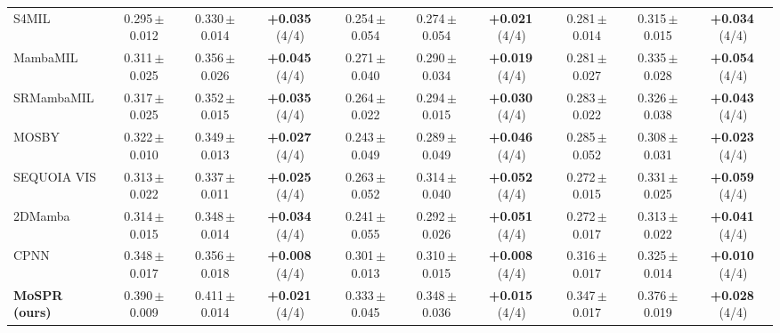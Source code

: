\begin{tabular}{lccccccccc}
S4MIL & 0.295\,{\tiny$\pm$0.012} & 0.330\,{\tiny$\pm$0.014} & \textbf{+0.035}\,{\tiny(4/4)} & 0.254\,{\tiny$\pm$0.054} & 0.274\,{\tiny$\pm$0.054} & \textbf{+0.021}\,{\tiny(4/4)} & 0.281\,{\tiny$\pm$0.014} & 0.315\,{\tiny$\pm$0.015} & \textbf{+0.034}\,{\tiny(4/4)}\\
MambaMIL & 0.311\,{\tiny$\pm$0.025} & 0.356\,{\tiny$\pm$0.026} & \textbf{+0.045}\,{\tiny(4/4)} & 0.271\,{\tiny$\pm$0.040} & 0.290\,{\tiny$\pm$0.034} & \textbf{+0.019}\,{\tiny(4/4)} & 0.281\,{\tiny$\pm$0.027} & 0.335\,{\tiny$\pm$0.028} & \textbf{+0.054}\,{\tiny(4/4)}\\
SRMambaMIL & 0.317\,{\tiny$\pm$0.025} & 0.352\,{\tiny$\pm$0.015} & \textbf{+0.035}\,{\tiny(4/4)} & 0.264\,{\tiny$\pm$0.022} & 0.294\,{\tiny$\pm$0.015} & \textbf{+0.030}\,{\tiny(4/4)} & 0.283\,{\tiny$\pm$0.022} & 0.326\,{\tiny$\pm$0.038} & \textbf{+0.043}\,{\tiny(4/4)}\\
MOSBY & 0.322\,{\tiny$\pm$0.010} & 0.349\,{\tiny$\pm$0.013} & \textbf{+0.027}\,{\tiny(4/4)} & 0.243\,{\tiny$\pm$0.049} & 0.289\,{\tiny$\pm$0.049} & \textbf{+0.046}\,{\tiny(4/4)} & 0.285\,{\tiny$\pm$0.052} & 0.308\,{\tiny$\pm$0.031} & \textbf{+0.023}\,{\tiny(4/4)}\\
SEQUOIA VIS & 0.313\,{\tiny$\pm$0.022} & 0.337\,{\tiny$\pm$0.011} & \textbf{+0.025}\,{\tiny(4/4)} & 0.263\,{\tiny$\pm$0.052} & 0.314\,{\tiny$\pm$0.040} & \textbf{+0.052}\,{\tiny(4/4)} & 0.272\,{\tiny$\pm$0.015} & 0.331\,{\tiny$\pm$0.025} & \textbf{+0.059}\,{\tiny(4/4)}\\
2DMamba & 0.314\,{\tiny$\pm$0.015} & 0.348\,{\tiny$\pm$0.014} & \textbf{+0.034}\,{\tiny(4/4)} & 0.241\,{\tiny$\pm$0.055} & 0.292\,{\tiny$\pm$0.026} & \textbf{+0.051}\,{\tiny(4/4)} & 0.272\,{\tiny$\pm$0.017} & 0.313\,{\tiny$\pm$0.022} & \textbf{+0.041}\,{\tiny(4/4)}\\
CPNN & 0.348\,{\tiny$\pm$0.017} & 0.356\,{\tiny$\pm$0.018} & \textbf{+0.008}\,{\tiny(4/4)} & 0.301\,{\tiny$\pm$0.013} & 0.310\,{\tiny$\pm$0.015} & \textbf{+0.008}\,{\tiny(4/4)} & 0.316\,{\tiny$\pm$0.017} & 0.325\,{\tiny$\pm$0.014} & \textbf{+0.010}\,{\tiny(4/4)}\\
\textbf{MoSPR (ours)} & 0.390\,{\tiny$\pm$0.009} & 0.411\,{\tiny$\pm$0.014} & \textbf{+0.021}\,{\tiny(4/4)} & 0.333\,{\tiny$\pm$0.045} & 0.348\,{\tiny$\pm$0.036} & \textbf{+0.015}\,{\tiny(4/4)} & 0.347\,{\tiny$\pm$0.017} & 0.376\,{\tiny$\pm$0.019} & \textbf{+0.028}\,{\tiny(4/4)}\\
\bottomrule
\end{tabular}
